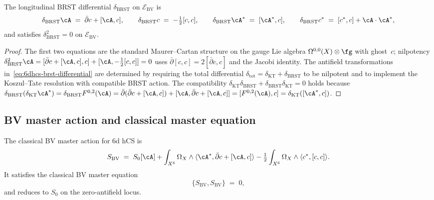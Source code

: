 \begin{proposition}
\label{prop:6dhcs-brst-differential}
The longitudinal BRST differential $\delta_{\mathrm{BRST}}$ on
$\mathcal{E}_{\mathrm{BV}}$ is
\begin{equation}\label{eq:6dhcs-brst-differential}
 \delta_{\mathrm{BRST}} \cA \;=\; \bar\partial c + [\cA, c],
 \qquad
 \delta_{\mathrm{BRST}} c \;=\; -\tfrac12 [c, c],
 \qquad
 \delta_{\mathrm{BRST}} \cA^* \;=\; [\cA^*, c],
 \qquad
 \delta_{\mathrm{BRST}} c^* \;=\; [c^*, c] + \cA \cdot \cA^*,
\end{equation}
and satisfies $\delta_{\mathrm{BRST}}^2 = 0$ on
$\mathcal{E}_{\mathrm{BV}}$.
\end{proposition}

\begin{proof}
The first two equations are the standard Maurer--Cartan structure on
the gauge Lie algebra $\Omega^{0,0}(X) \otimes \fg$ with ghost~$c$;
nilpotency $\delta_{\mathrm{BRST}}^2 \cA = [\bar\partial c + [\cA,c],
c] + [\cA, -\tfrac12[c,c]] = 0$ uses $\bar\partial[c,c] = 2[\bar\partial
c, c]$ and the Jacobi identity. The antifield transformations
in~\eqref{eq:6dhcs-brst-differential} are determined by requiring
the total differential $\delta_{\mathrm{tot}} = \delta_{\mathrm{KT}} +
\delta_{\mathrm{BRST}}$ to be nilpotent and to implement the Koszul--Tate
resolution with compatible BRST action. The compatibility
$\delta_{\mathrm{KT}} \delta_{\mathrm{BRST}} + \delta_{\mathrm{BRST}}
\delta_{\mathrm{KT}} = 0$ holds because
$\delta_{\mathrm{BRST}}(\delta_{\mathrm{KT}} \cA^*)
= \delta_{\mathrm{BRST}} F^{0,2}(\cA)
= \bar\partial(\bar\partial c + [\cA,c]) + [\cA, \bar\partial c + [\cA,c]]
= [F^{0,2}(\cA), c]
= \delta_{\mathrm{KT}}([\cA^*, c])$.
\end{proof}

\subsection{BV master action and classical master equation}
\label{subsec:6dhcs-bv-master-action}

\begin{theorem}
\label{thm:6dhcs-bv-master-action}
The classical BV master action for 6d hCS is
\begin{equation}\label{eq:6dhcs-bv-master-action}
 S_{\mathrm{BV}}
 \;=\;
 S_0[\cA]
 + \int_{X^6} \Omega_X \wedge \langle \cA^*, \bar\partial c + [\cA, c]
 \rangle
 - \tfrac12 \int_{X^6} \Omega_X \wedge \langle c^*, [c, c]\rangle.
\end{equation}
It satisfies the classical BV master equation
\begin{equation}\label{eq:6dhcs-cme}
 \{S_{\mathrm{BV}}, S_{\mathrm{BV}}\} \;=\; 0,
\end{equation}
and reduces to $S_0$ on the zero-antifield locus.
\end{theorem}

